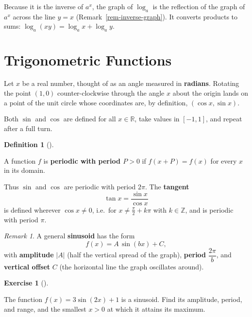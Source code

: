 \documentclass[
  letterpaper,
  DIV=11,
  numbers=noendperiod]{scrreprt}
\theoremstyle{plain}
\theoremstyle{plain}
\theoremstyle{definition}
\newtheorem{definition}{Definition}[chapter]
\theoremstyle{definition}
\newtheorem{exercise}{Exercise}[chapter]
\theoremstyle{definition}
\theoremstyle{plain}
\theoremstyle{plain}
\theoremstyle{remark}
\newtheorem{refremark}{Remark}[chapter]
\begin{document}
Because it is the inverse of \(a^x\), the graph of \(\log_a\) is the
reflection of the graph of \(a^x\) across the line \(y = x\)
(Remark~\ref{rem-inverse-graph}). It converts products to sums:
\(\log_a(xy) = \log_a x + \log_a y\).

\section{Trigonometric Functions}\label{trigonometric-functions}

Let \(x\) be a real number, thought of as an angle measured in
\textbf{radians}. Rotating the point \((1,0)\) counter-clockwise through
the angle \(x\) about the origin lands on a point of the unit circle
whose coordinates are, by definition, \((\cos x, \sin x)\).

Both \(\sin\) and \(\cos\) are defined for all \(x\in\mathbb{R}\), take
values in \([-1,1]\), and repeat after a full turn.

\begin{definition}[]\protect\hypertarget{def-periodic}{}\label{def-periodic}

\hfill\break
A function \(f\) is \textbf{periodic with period \(P > 0\)} if
\(f(x + P) = f(x)\) for every \(x\) in its domain.

\end{definition}

Thus \(\sin\) and \(\cos\) are periodic with period \(2\pi\). The
\textbf{tangent} \[
\tan x = \frac{\sin x}{\cos x}
\] is defined wherever \(\cos x \neq 0\), i.e.~for
\(x \neq \tfrac{\pi}{2} + k\pi\) with \(k\in\mathbb{Z}\), and is
periodic with period \(\pi\).

\begin{refremark}
A general \textbf{sinusoid} has the form \[
f(x) = A\,\sin(bx) + C,
\] with \textbf{amplitude} \(|A|\) (half the vertical spread of the
graph), \textbf{period} \(\dfrac{2\pi}{b}\), and \textbf{vertical
offset} \(C\) (the horizontal line the graph oscillates around).

\label{rem-sinusoid}

\end{refremark}

\begin{exercise}[]\protect\hypertarget{exr-sinusoid}{}\label{exr-sinusoid}

The function \(f(x) = 3\sin(2x) + 1\) is a sinusoid. Find its amplitude,
period, and range, and the smallest \(x > 0\) at which it attains its
maximum.

\end{exercise}
\end{document}
